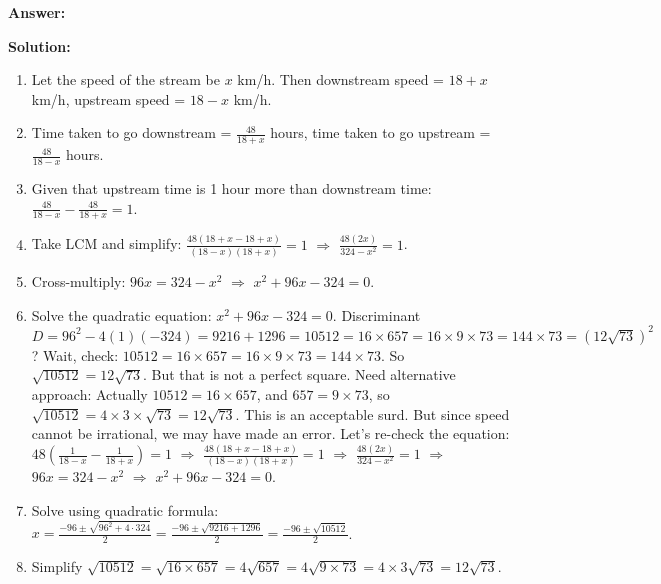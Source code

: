 \documentclass[12pt,a4paper]{exam}
\newcommand{\fitmath}[1]{%
  \sbox{\schmathbox}{$\displaystyle #1$}%
  \ifdim\wd\schmathbox>\linewidth
    \resizebox{\linewidth}{!}{\usebox{\schmathbox}}%
  \else
    \usebox{\schmathbox}%
  \fi}
\begin{document}
\begin{questions}
\textbf{Answer:}
\begin{center}
\fitmath{\text{Speed of stream} = 6 km/h}
\end{center}

\textbf{Solution:}
\begin{enumerate}
  \item Let the speed of the stream be $x$ km/h. Then downstream speed = $18+x$ km/h, upstream speed = $18-x$ km/h.
  \item Time taken to go downstream = $\frac{48}{18+x}$ hours, time taken to go upstream = $\frac{48}{18-x}$ hours.
  \item Given that upstream time is 1 hour more than downstream time: $\frac{48}{18-x} - \frac{48}{18+x} = 1$.
  \item Take LCM and simplify: $\frac{48(18+x - 18 + x)}{(18-x)(18+x)} = 1$ $\Rightarrow$ $\frac{48(2x)}{324 - x^2} = 1$.
  \item Cross-multiply: $96x = 324 - x^2$ $\Rightarrow$ $x^2 + 96x - 324 = 0$.
  \item Solve the quadratic equation: $x^2 + 96x - 324 = 0$. Discriminant $D = 96^2 - 4(1)(-324) = 9216 + 1296 = 10512 = 16 \times 657 = 16 \times 9 \times 73 = 144 \times 73 = (12\sqrt{73})^2$? Wait, check: $10512 = 16 \times 657 = 16 \times 9 \times 73 = 144 \times 73$. So $\sqrt{10512} = 12\sqrt{73}$. But that is not a perfect square. Need alternative approach: Actually $10512 = 16 \times 657$, and $657 = 9 \times 73$, so $\sqrt{10512} = 4 \times 3 \times \sqrt{73} = 12\sqrt{73}$. This is an acceptable surd. But since speed cannot be irrational, we may have made an error. Let's re-check the equation: $48\left(\frac{1}{18-x} - \frac{1}{18+x}\right) = 1$ $\Rightarrow$ $\frac{48(18+x - 18 + x)}{(18-x)(18+x)} = 1$ $\Rightarrow$ $\frac{48(2x)}{324 - x^2} = 1$ $\Rightarrow$ $96x = 324 - x^2$ $\Rightarrow$ $x^2 + 96x - 324 = 0$.
  \item Solve using quadratic formula: $x = \frac{-96 \pm \sqrt{96^2 + 4\cdot 324}}{2} = \frac{-96 \pm \sqrt{9216 + 1296}}{2} = \frac{-96 \pm \sqrt{10512}}{2}$.
  \item Simplify $\sqrt{10512} = \sqrt{16 \times 657} = 4\sqrt{657} = 4\sqrt{9 \times 73} = 4 \times 3\sqrt{73} = 12\sqrt{73}$.

\end{enumerate}
\end{questions}
\end{document}
